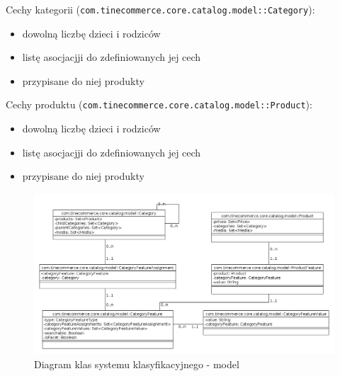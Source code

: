 \noindent Cechy kategorii (\texttt{com.tinecommerce.core.catalog.model::Category}):
\begin{itemize}
	\item dowolną liczbę dzieci i rodziców
	\item listę asocjacjji do zdefiniowanych jej cech
	\item przypisane do niej produkty
\end{itemize} 
Cechy produktu (\texttt{com.tinecommerce.core.catalog.model::Product}):
\begin{itemize}
	\item dowolną liczbę dzieci i rodziców
	\item listę asocjacjji do zdefiniowanych jej cech
	\item przypisane do niej produkty
\end{itemize} 
\begin{figure}[H]
	\begin{center}
		\includegraphics[scale=0.5,angle=270]{klasy_model_sysKlas.png}
	\end{center}
	\caption{{\color{black}Diagram klas systemu klasyfikacyjnego - model}} \label{klasy_model_sysKlas}
\end{figure}

